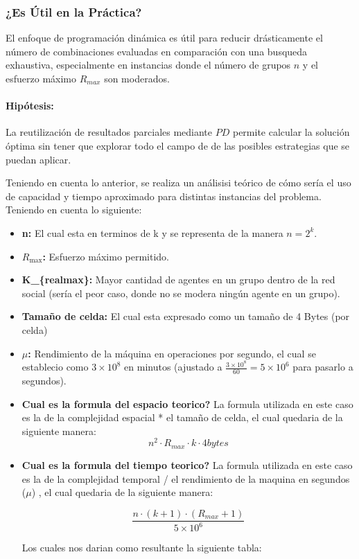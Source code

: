\documentclass[11pt,letter]{article}
\begin{document}
    \subsubsection{¿Es Útil en la Práctica?}
    El enfoque de programación dinámica es útil para reducir drásticamente el número de combinaciones evaluadas en comparación con una busqueda exhaustiva, especialmente en instancias donde el número de grupos $n$ y el esfuerzo máximo $R_{max}$ son moderados.


    \paragraph{Hipótesis:}

    La reutilización de resultados parciales mediante $PD$ permite calcular la solución óptima sin tener que explorar todo el campo de de las posibles estrategias que se puedan aplicar.

    Teniendo en cuenta lo anterior, se realiza un análisisi teórico de cómo sería el uso de capacidad y tiempo aproximado para distintas instancias del problema. Teniendo en cuenta lo siguiente:

\begin{itemize}

  \item \textbf{n:}
  El cual esta en terminos de k y se representa de la manera $n=2^k$.

  \item \textbf{$R_{\text{max}}$:}
  Esfuerzo máximo permitido.

  \item \textbf{K\_\{realmax\}:}
  Mayor cantidad de agentes en un grupo dentro de la red social (sería el peor caso, donde no se modera ningún agente en un grupo).

  \item \textbf{Tamaño de celda:}
  El cual esta expresado como un tamaño de 4 Bytes (por celda)

  \item \textbf{$\mu$:}
  Rendimiento de la máquina en operaciones por segundo, el cual se establecio como $3 \times 10^8$ en minutos  (ajustado a $\frac{3 \times 10^{8}}{60} = 5 \times 10^{6}$ para pasarlo a segundos).

    \item \textbf{Cual es la formula del espacio teorico?}
La formula utilizada en este caso es la de la complejidad espacial * el tamaño de celda, el cual quedaria de la siguiente manera:
    \[
        n^2 \cdot R_{max} \cdot k \cdot 4 bytes
    \]

    \item \textbf{Cual es la formula del tiempo teorico?}
La formula utilizada en este caso es la de la complejidad temporal / el rendimiento de la maquina en segundos ($\mu$) , el cual quedaria de la siguiente manera:

\[
\frac{n \cdot (k+1) \cdot (R_{max}+1)}{5 \times 10^{6}}
\]


Los cuales nos darian como resultante la siguiente tabla:
\end{itemize}
\end{document}
